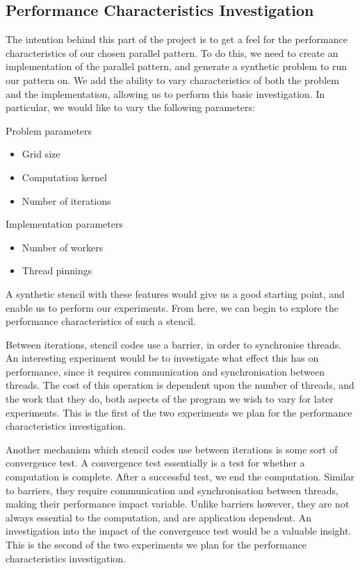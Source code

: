 \subsection{Performance Characteristics Investigation}
\label{section:design:performance_characteristics_investigation}

The intention behind this part of the project is to get a feel for the performance characteristics of our chosen parallel pattern. To do this, we need to create an implementation of the parallel pattern, and generate a synthetic problem to run our pattern on. We add the ability to vary characteristics of both the problem and the implementation, allowing us to perform this basic investigation. In particular, we would like to vary the following parameters:

Problem parameters
\begin{itemize}
    \item Grid size
    \item Computation kernel
    \item Number of iterations
\end{itemize}

Implementation parameters
\begin{itemize}
    \item Number of workers
    \item Thread pinnings
\end{itemize}



A synthetic stencil with these features would give us a good starting point, and enable us to perform our experiments. From here, we can begin to explore the performance characteristics of such a stencil.

Between iterations, stencil codes use a barrier, in order to synchronise threads. An interesting experiment would be to investigate what effect this has on performance, since it requires communication and synchronisation between threads. The cost of this operation is dependent upon the number of threads, and the work that they do, both aspects of the program we wish to vary for later experiments. This is the first of the two experiments we plan for the performance characteristics investigation.

Another mechanism which stencil codes use between iterations is some sort of convergence test. A convergence test essentially is a test for whether a computation is complete. After a successful test, we end the computation. Similar to barriers, they require communication and synchronisation between threads, making their performance impact variable. Unlike barriers however, they are not always essential to the computation, and are application dependent. An investigation into the impact of the convergence test would be a valuable insight. This is the second of the two experiments we plan for the performance characteristics investigation.

